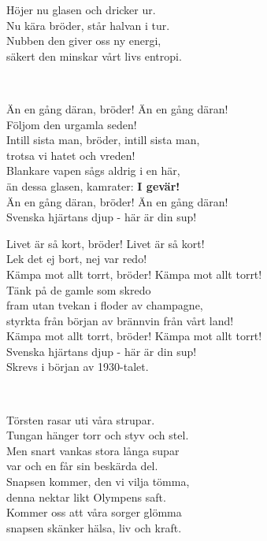 Höjer nu glasen och dricker ur.\\
Nu kära bröder, står halvan i tur.\\
Nubben den giver oss ny energi,\\
säkert den minskar vårt livs entropi.\\

\newpage


 \\       

\songtext{}
Än en gång däran, bröder! Än en gång däran!\\
Följom den urgamla seden!\\
Intill sista man, bröder, intill sista man,\\
trotsa vi hatet och vreden!\\
Blankare vapen sågs aldrig i en här,\\
än dessa glasen, kamrater: \textbf{I gevär!}\\
Än en gång däran, bröder! Än en gång däran!\\
Svenska hjärtans djup - här är din sup!

Livet är så kort, bröder! Livet är så kort!\\
Lek det ej bort, nej var redo!\\
Kämpa mot allt torrt, bröder! Kämpa mot allt torrt!\\
Tänk på de gamle som skredo\\
fram utan tvekan i floder av champagne,\\
styrkta från början av brännvin från vårt land!\\
Kämpa mot allt torrt, bröder! Kämpa mot allt torrt!\\
Svenska hjärtans djup - här är din sup!\\
Skrevs i början av 1930-talet.\\

\newpage 


 \\       

\songtext{}
Törsten rasar uti våra strupar.\\
Tungan hänger torr och styv och stel.\\
Men snart vankas stora långa supar\\
var och en får sin beskärda del.\\
Snapsen kommer, den vi vilja tömma,\\
denna nektar likt Olympens saft.\\
Kommer oss att våra sorger glömma\\
snapsen skänker hälsa, liv och kraft.

